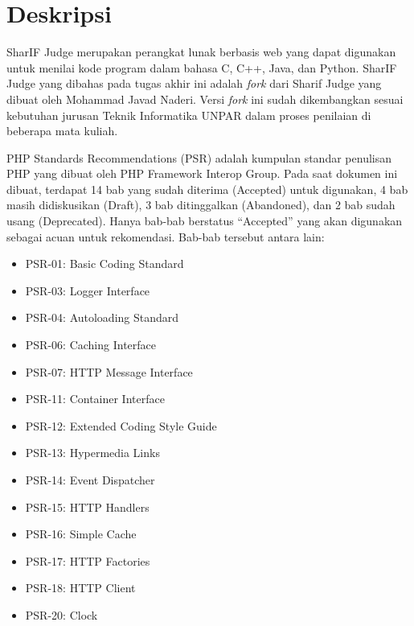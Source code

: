 \documentclass[a4paper,twoside]{article}
\begin{document}
	
	\title{\@judultopik}
	\author{\nama \textendash \@npm} 
	
	\newcommand{\nama}{Nicholas Khrisna Sandyawan}
	\newcommand{\@npm}{6181801060}
	\newcommand{\@judultopik}{Evaluasi PHP Standards Recommendations pada proyek SharIF Judge} %
	\newcommand{\jumpemb}{1} %
	\newcommand{\tanggal}{27/09/2023}
	
	
	\maketitle
	
	
	\section{Deskripsi}
	SharIF Judge merupakan perangkat lunak berbasis web yang dapat digunakan untuk menilai kode program dalam bahasa C, C++, Java, dan Python. SharIF Judge yang dibahas pada tugas akhir ini adalah \textit{fork} dari Sharif Judge yang dibuat oleh Mohammad Javad Naderi. Versi \textit{fork} ini sudah dikembangkan sesuai kebutuhan jurusan Teknik Informatika UNPAR dalam proses penilaian di beberapa mata kuliah.
	
	PHP Standards Recommendations (PSR) adalah kumpulan standar penulisan PHP yang dibuat oleh PHP Framework Interop Group. Pada saat dokumen ini dibuat, terdapat 14 bab yang sudah diterima (Accepted) untuk digunakan, 4 bab masih didiskusikan (Draft), 3 bab ditinggalkan (Abandoned), dan 2 bab sudah usang (Deprecated). Hanya bab-bab  berstatus ``Accepted'' yang akan digunakan sebagai acuan untuk rekomendasi. Bab-bab tersebut antara lain: 
	\begin{itemize}
		\item PSR-01: Basic Coding Standard
		\item PSR-03: Logger Interface
		\item PSR-04: Autoloading Standard
		\item PSR-06: Caching Interface
		\item PSR-07: HTTP Message Interface
		\item PSR-11: Container Interface
		\item PSR-12: Extended Coding Style Guide
		\item PSR-13: Hypermedia Links
		\item PSR-14: Event Dispatcher
		\item PSR-15: HTTP Handlers
		\item PSR-16: Simple Cache
		\item PSR-17: HTTP Factories
		\item PSR-18: HTTP Client
		\item PSR-20: Clock
	\end{itemize}
	
\end{document}
